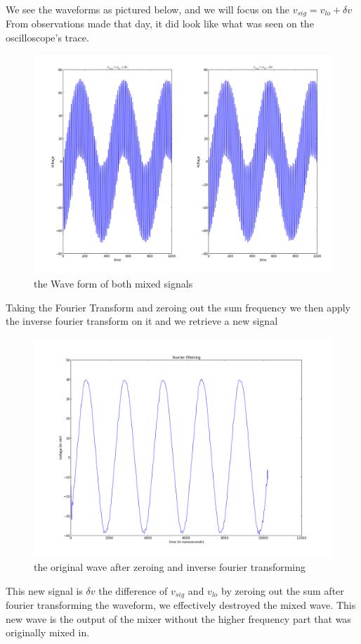 \documentclass[12 pt]{article}
\begin{document}
We see the waveforms as pictured below,  and we will focus on the
$v_{sig} = v_{lo} + \delta v$ From observations made that day, it did
look like what was seen on the oscilloscope's trace.
\begin{figure}[H]
\center
\includegraphics[scale=0.4]{mixedsignals.png}
\caption{the Wave form of both mixed signals}
\label{mixedsignals}
\end{figure}
 Taking the Fourier
Transform and zeroing out the sum frequency we then apply the inverse
fourier transform on it and we retrieve a new signal

\begin{figure}[H]
\center
\includegraphics[scale=0.4]{fourierfiltering01.png}
\caption{the original wave after zeroing and inverse fourier transforming}
\label{fourierfiltering01}
\end{figure}
This new signal is $\delta v$ the difference of $v _{sig}$ and $v_{lo}$
by zeroing out the sum after fourier transforming the waveform, we
effectively destroyed the mixed wave. This new wave is the output of the
mixer without the higher frequency part that was originally mixed in. 
\end{document}
